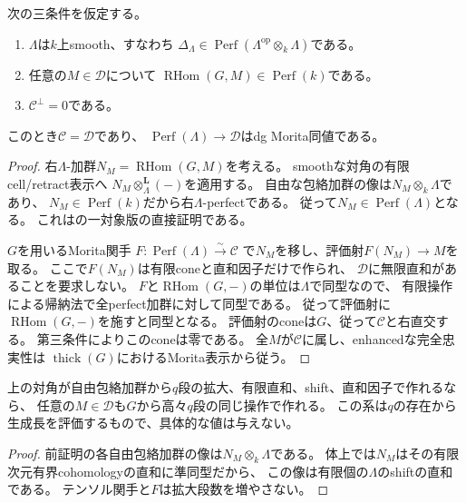 \begin{theorem}[有限性とsmoothnessによる全体への飽和]
\label{crs:thm:abstract}
次の三条件を仮定する。
\begin{enumerate}
\item $\Lambda$は$k$上smooth、すなわち
$\Delta_\Lambda\in\operatorname{Perf}(\Lambda^{\mathrm{op}}\otimes_k\Lambda)$である。
\item 任意の$M\in\mathcal D$について
$\operatorname{RHom}(G,M)\in\operatorname{Perf}(k)$である。
\item $\mathcal C^\perp=0$である。
\end{enumerate}
このとき$\mathcal C=\mathcal D$であり、
$\operatorname{Perf}(\Lambda)\to\mathcal D$はdg Morita同値である。
\end{theorem}
\begin{proof}
右$\Lambda$-加群$N_M=\operatorname{RHom}(G,M)$を考える。
smoothな対角の有限cell/retract表示へ
$N_M\otimes_\Lambda^{\mathbf L}(-)$を適用する。
自由な包絡加群の像は$N_M\otimes_k\Lambda$であり、
$N_M\in\operatorname{Perf}(k)$だから右$\Lambda$-perfectである。
従って$N_M\in\operatorname{Perf}(\Lambda)$となる。
これは\cite[Lemma~2.8(2)]{CRSTV}の一対象版の直接証明である。

$G$を用いるMorita関手
$F:\operatorname{Perf}(\Lambda)\xrightarrow{\sim}\mathcal C$
で$N_M$を移し、評価射$F(N_M)\to M$を取る。
ここで$F(N_M)$は有限coneと直和因子だけで作られ、
$\mathcal D$に無限直和があることを要求しない。
$F$と$\operatorname{RHom}(G,-)$の単位は$\Lambda$で同型なので、
有限操作による帰納法で全perfect加群に対して同型である。
従って評価射に$\operatorname{RHom}(G,-)$を施すと同型となる。
評価射のconeは$G$、従って$\mathcal C$と右直交する。
第三条件によりこのconeは零である。
全$M$が$\mathcal C$に属し、enhancedな完全忠実性は
$\operatorname{thick}(G)$におけるMorita表示から従う。
\end{proof}

\begin{corollary}[対角の有限表示からの一様な生成長]
\label{crs:cor:level}
上の対角が自由包絡加群から$q$段の拡大、有限直和、shift、直和因子で作れるなら、
任意の$M\in\mathcal D$も$G$から高々$q$段の同じ操作で作れる。
この系は$q$の存在から生成長を評価するもので、具体的な値は与えない。
\end{corollary}
\begin{proof}
前証明の各自由包絡加群の像は$N_M\otimes_k\Lambda$である。
体上では$N_M$はその有限次元有界cohomologyの直和に準同型だから、
この像は有限個の$\Lambda$のshiftの直和である。
テンソル関手と$F$は拡大段数を増やさない。
\end{proof}

